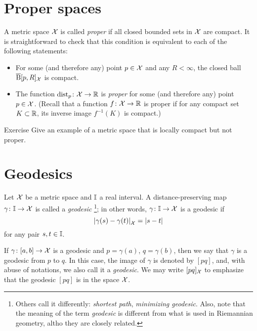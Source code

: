\section{Proper spaces}

A metric space $\mathcal{X}$ is called \emph{proper} if all closed bounded sets in $\mathcal{X}$ are compact.
It is straightforward to check that this condition is equivalent to each of the following statements:
\begin{itemize}
\item For some (and therefore any) point $p\in \mathcal{X}$ and any $R<\infty$, 
the closed ball $\overline{\mathrm{B}}{}[p,R]_{\mathcal{X}}$ is compact. 
\item The function $\mathrm{dist}_p\colon\mathcal{X}\to\mathbb{R}$ is \emph{proper} for some (and therefore any) point $p\in \mathcal{X}$.
(Recall that a function $f\colon\mathcal{X}\to\mathbb{R}$ is proper if for any compact set $K\subset \mathbb{R}$, its inverse image 
$f^{-1}(K)$
is compact.)
\end{itemize}

\begin{thm}{Exercise}\label{ex:loc-compact-not-proper}
Give an example of a metric space that is locally compact but not proper.
\end{thm}

\section{Geodesics}
\label{sec:geods}

Let $\mathcal{X}$ be a metric space 
and $\II$\index{$\II$} a real interval. 
A distance-preserving map $\gamma\colon\mathbb{I}\to \mathcal{X}$ is called a \emph{geodesic}%
\footnote{Others call it differently: {}\emph{shortest path}, {}\emph{minimizing geodesic}.
Also, note that the meaning of the term {}\emph{geodesic} is different from what is used in Riemannian geometry, altho they are closely related.}; 
in other words, $\gamma\colon\mathbb{I}\to \mathcal{X}$ is a geodesic if 
\[\dist{\gamma(s)}{\gamma(t)}{\spc{X}}=|s-t|\]
for any pair $s,t\in \mathbb{I}$.

If $\gamma\colon[a,b]\to \mathcal{X}$ is a geodesic and $p=\gamma(a)$, $q=\gamma(b)$, then we say that $\gamma$ is a geodesic from $p$ to $q$.
In this case, the image of $\gamma$ is denoted by $[p q]$\index{$[{*}{*}]$}, and, with abuse of notations, we also call it a \emph{geodesic}.
We may write $[p q]_{\mathcal{X}}$ 
to emphasize that the geodesic $[p q]$ is in the space  ${\mathcal{X}}$.

